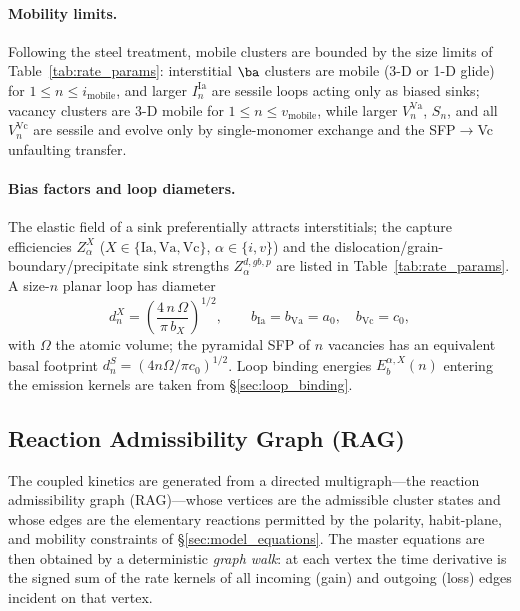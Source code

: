 \paragraph{Mobility limits.}
Following the steel treatment, mobile clusters are bounded by the size
limits of Table~\ref{tab:rate_params}: interstitial $\ba$ clusters are
mobile (3-D or 1-D glide) for $1\le n\le i_{\mathrm{mobile}}$, and
larger $I_n^{\mathrm{Ia}}$ are sessile loops acting only as biased
sinks; vacancy clusters are 3-D mobile for $1\le n\le v_{\mathrm{mobile}}$,
while larger $V_n^{\mathrm{Va}}$, $S_n$, and all $V_n^{\mathrm{Vc}}$ are
sessile and evolve only by single-monomer exchange and the SFP$\to$Vc
unfaulting transfer.

\paragraph{Bias factors and loop diameters.}
The elastic field of a sink preferentially attracts interstitials; the
capture efficiencies $Z_\alpha^{X}$ ($X\in\{\mathrm{Ia,Va,Vc}\}$,
$\alpha\in\{i,v\}$) and the dislocation/grain-boundary/precipitate
sink strengths $Z_\alpha^{d,gb,p}$ are listed in
Table~\ref{tab:rate_params}. A size-$n$ planar loop has diameter
\begin{equation}\label{eq:loop_diameter}
    d_n^{X} = \left(\frac{4\,n\,\Omega}{\pi\,b_X}\right)^{1/2},
    \qquad b_{\mathrm{Ia}}=b_{\mathrm{Va}}=a_0,\quad b_{\mathrm{Vc}}=c_0,
\end{equation}
with $\Omega$ the atomic volume; the pyramidal SFP of $n$ vacancies has
an equivalent basal footprint $d_n^{S}=(4n\Omega/\pi c_0)^{1/2}$. Loop
binding energies $E_b^{\alpha,X}(n)$ entering the emission kernels are
taken from \S\ref{sec:loop_binding}.

\subsection{Reaction Admissibility Graph (\textsc{RAG})}
\label{sec:rag}
The coupled kinetics are generated from a directed multigraph---the
reaction admissibility graph (\textsc{RAG})---whose vertices are the
admissible cluster states and whose edges are the elementary reactions
permitted by the polarity, habit-plane, and mobility constraints of
\S\ref{sec:model_equations}. The master equations are then obtained by
a deterministic \emph{graph walk}: at each vertex the time derivative
is the signed sum of the rate kernels of all incoming (gain) and
outgoing (loss) edges incident on that vertex.


